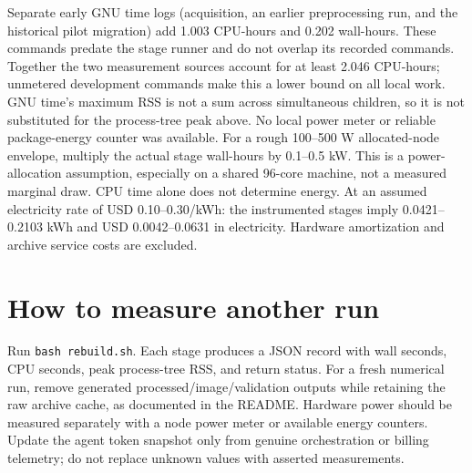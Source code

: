 \documentclass[11pt]{article}
\begin{document}
Separate early GNU time logs (acquisition, an earlier preprocessing run, and the historical pilot migration) add 1.003 CPU-hours and 0.202 wall-hours. These commands predate the stage runner and do not overlap its recorded commands. Together the two measurement sources account for at least 2.046 CPU-hours; unmetered development commands make this a lower bound on all local work. GNU time's maximum RSS is not a sum across simultaneous children, so it is not substituted for the process-tree peak above.
No local power meter or reliable package-energy counter was available. For a
rough 100--500 W allocated-node envelope, multiply the actual stage wall-hours
by 0.1--0.5 kW. This is a power-allocation assumption, especially on a shared
96-core machine, not a measured marginal draw. CPU time alone does not determine
energy. At an assumed electricity rate of USD 0.10--0.30/kWh:
the instrumented stages imply 0.0421--0.2103 kWh and USD 0.0042--0.0631 in electricity. Hardware amortization and archive service costs are excluded.
\section{How to measure another run}
Run \texttt{bash rebuild.sh}. Each stage produces a JSON record with wall seconds,
CPU seconds, peak process-tree RSS, and return status. For a fresh numerical run,
remove generated processed/image/validation outputs while retaining the raw archive
cache, as documented in the README. Hardware power should be measured separately
with a node power meter or available energy counters. Update the agent token
snapshot only from genuine orchestration or billing telemetry; do not replace
unknown values with asserted measurements.
\end{document}
